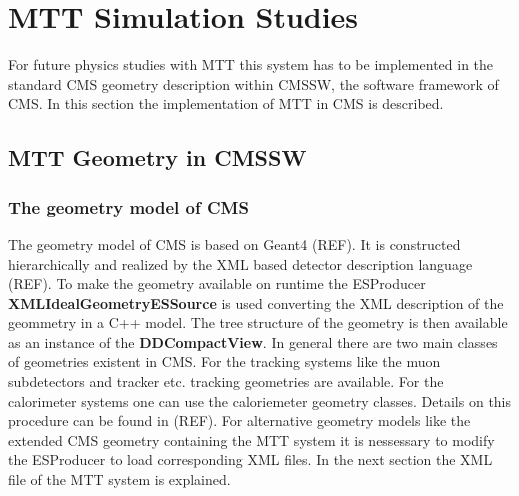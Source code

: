 \section{MTT Simulation Studies}
For future physics studies with MTT this system has to be implemented in the standard CMS geometry description within CMSSW, the software framework of CMS.
In this section the implementation of MTT in CMS is described.
\subsection{MTT Geometry in CMSSW}
	\subsubsection{The geometry model of CMS}
	The geometry model of CMS is based on Geant4 (REF).
	It is constructed hierarchically and realized by the XML based detector description language (REF).
	To make the geometry available on runtime the ESProducer \textbf{XMLIdealGeometryESSource} is used converting the XML description of the geommetry in a C++ model.
	The tree structure of the geometry is then available as an instance of the \textbf{DDCompactView}.
	In general there are two main classes of geometries existent in CMS.
	For the tracking systems like the muon subdetectors and tracker etc. tracking geometries are available.
	For the calorimeter systems one can use the caloriemeter geometry classes.
	Details on this procedure can be found in (REF).
	For alternative geometry models like the extended CMS geometry containing the MTT system it is nessessary to modify the ESProducer to load corresponding XML files.
	In the next section the XML file of the MTT system is explained.
